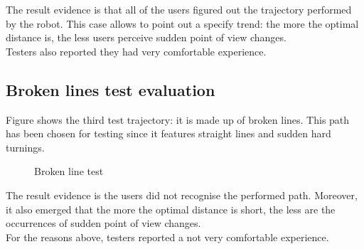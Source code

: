 The result evidence is that all of the users figured out the
trajectory performed by the robot. This case allows to point out
a specify trend: the more the optimal distance is, the less users
perceive sudden point of view changes.
\\
Testers also reported they had very comfortable experience.


\subsection{Broken lines test evaluation}
\label{performance_evaluation:tests_result:zigzagtest}

Figure  shows the third test trajectory:
it is made up of broken lines. This path has been chosen for testing
since it features straight lines and sudden hard turnings.

\begin{figure}[!htp]
  \begin{center}

    \vspace*{30pt}
  \end{center}
  \caption{Broken line test}
  \label{fig:zigzag}
\end{figure}

The result evidence is the users did not recognise the performed path.
Moreover, it also emerged that the more the optimal distance is short,
the less are the occurrences of sudden point of view changes.
\\
For the reasons above, testers reported a not very comfortable experience.
